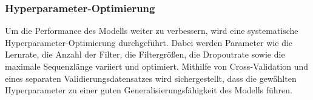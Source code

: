 \subsubsection{Hyperparameter-Optimierung}
Um die Performance des Modells weiter zu verbessern, wird eine systematische Hyperparameter-Optimierung durchgeführt. Dabei werden Parameter wie die Lernrate, die Anzahl der Filter, die Filtergrößen, die Dropoutrate sowie die maximale Sequenzlänge variiert und optimiert. Mithilfe von Cross-Validation und eines separaten Validierungsdatensatzes wird sichergestellt, dass die gewählten Hyperparameter zu einer guten Generalisierungsfähigkeit des Modells führen.
